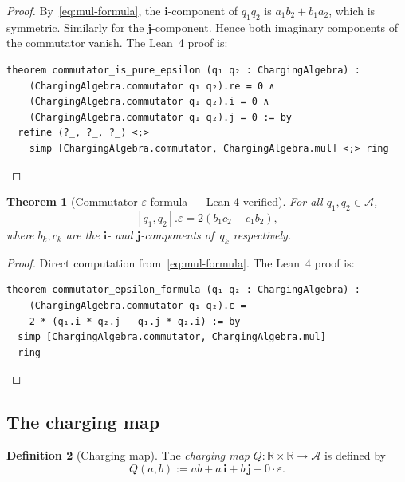 \documentclass[11pt,a4paper]{article}
\newtheorem{theorem}{Theorem}[section]
\theoremstyle{definition}
\newtheorem{definition}[theorem]{Definition}
\theoremstyle{remark}
\begin{document}
\begin{proof}
By~\eqref{eq:mul-formula}, the $\mathbf{i}$-component of
$q_1 q_2$ is $a_1 b_2 + b_1 a_2$, which is symmetric.
Similarly for the $\mathbf{j}$-component. Hence both
imaginary components of the commutator vanish.
The Lean~4 proof is:
\begin{lstlisting}[language=Lean]
theorem commutator_is_pure_epsilon (q₁ q₂ : ChargingAlgebra) :
    (ChargingAlgebra.commutator q₁ q₂).re = 0 ∧
    (ChargingAlgebra.commutator q₁ q₂).i = 0 ∧
    (ChargingAlgebra.commutator q₁ q₂).j = 0 := by
  refine ⟨?_, ?_, ?_⟩ <;>
    simp [ChargingAlgebra.commutator, ChargingAlgebra.mul] <;> ring
\end{lstlisting}
\end{proof}

\begin{theorem}[Commutator $\varepsilon$-formula --- Lean 4 verified]
\label{thm:epsilon-formula}
For all $q_1, q_2 \in \mathcal{A}$,
\begin{equation}\label{eq:commutator-epsilon}
  [q_1, q_2].\varepsilon = 2(b_1 c_2 - c_1 b_2),
\end{equation}
where $b_k, c_k$ are the $\mathbf{i}$- and $\mathbf{j}$-components
of~$q_k$ respectively.
\end{theorem}

\begin{proof}
Direct computation from~\eqref{eq:mul-formula}. The Lean~4 proof is:
\begin{lstlisting}[language=Lean]
theorem commutator_epsilon_formula (q₁ q₂ : ChargingAlgebra) :
    (ChargingAlgebra.commutator q₁ q₂).ε =
    2 * (q₁.i * q₂.j - q₁.j * q₂.i) := by
  simp [ChargingAlgebra.commutator, ChargingAlgebra.mul]
  ring
\end{lstlisting}
\end{proof}

\subsection{The charging map}

\begin{definition}[Charging map]\label{def:charging-map}
The \emph{charging map} $Q \colon \mathbb{R} \times \mathbb{R}
\to \mathcal{A}$ is defined by
\begin{equation}
  Q(a, b) := ab + a\,\mathbf{i} + b\,\mathbf{j} + 0\cdot\varepsilon.
\end{equation}
\end{definition}
\end{document}
